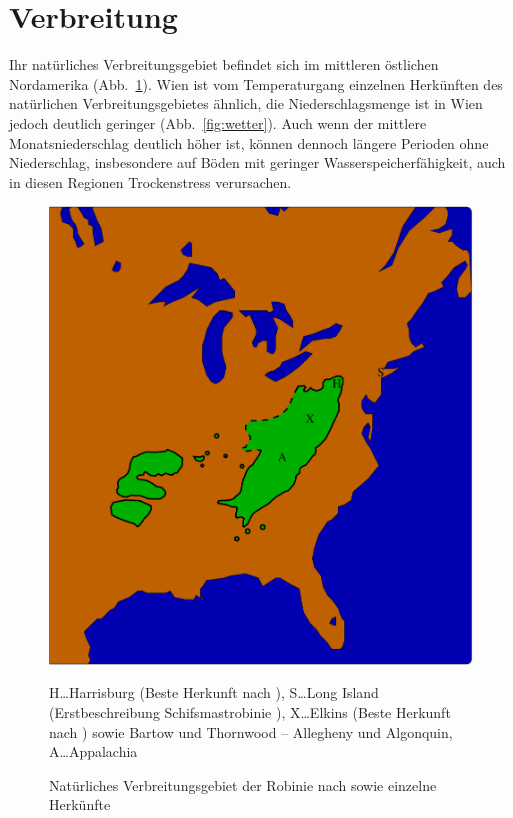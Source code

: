 \documentclass[twocolumn]{scrartcl}
\begin{document}
\section{Verbreitung}

Ihr natürliches Verbreitungsgebiet
befindet sich im mittleren östlichen Nordamerika
(Abb.~\ref{fig:verbreitungNatuerlich}). Wien ist vom Temperaturgang einzelnen
Herkünften des natürlichen Verbreitungsgebietes ähnlich, die Niederschlagsmenge
ist in Wien jedoch deutlich geringer (Abb.~\ref{fig:wetter}). Auch wenn der
mittlere Monatsniederschlag deutlich höher ist, können dennoch längere Perioden
ohne Niederschlag, insbesondere auf Böden mit geringer Wasserspeicherfähigkeit,
auch in diesen Regionen Trockenstress verursachen.

\begin{figure}[htbp]
  \centering
  \includegraphics[width=.9\linewidth]{./bild/map4}
  \caption{Natürliches Verbreitungsgebiet der Robinie nach \cite{little1971treeAtlas} sowie einzelne Herkünfte}
  \footnotesize{H\dots Harrisburg (Beste Herkunft nach \cite{cobbett1825woodlands}),
    S\dots Long Island (Erstbeschreibung Schifsmastrobinie \cite{raber1936shipmast}),
    X\dots Elkins (Beste Herkunft nach \cite{hopp1941robinie}) sowie Bartow und Thornwood -- Allegheny und Algonquin,
    A\dots Appalachia}
  \label{fig:verbreitungNatuerlich}
\end{figure}
\end{document}
